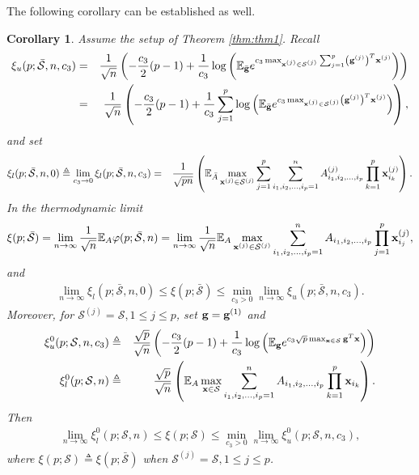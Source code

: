 \documentclass[10pt]{article}
\def\x{{\bf x}}
\def\x{{\mathbf x}}
\def\x{{\bf x}}
\def\x{{\bf x}}
\def\g{{\bf g}}
\def\mE{{\mathbb E}}
\def\lp{\left (}
\def\rp{\right )}
\def\x{{\bf x}}
\def\x{{\mathbf x}}
\def\x{{\bf x}}
\def\x{{\bf x}}
\def\g{{\bf g}}
\def\cS{{\mathcal S}}
\def\bcS{\bar{\mathcal S}}
\newtheorem{corollary}{Corollary}
\begin{document}
The following corollary can be established as well.
\begin{corollary}
\label{cor:cor1}
 Assume the setup of Theorem \ref{thm:thm1}. Recall
\begin{eqnarray}
   \label{eq:cor1eq1}
\xi_u(p;\bcS,n,c_3) & = & \frac{1}{\sqrt{n}} \lp -\frac{c_{3}}{2}(p-1)  + \frac{1}{c_{3}} \log\lp  \mE_{\bar{\g}} e^{c_{3}\max_{\x^{(j)}\in\cS^{(j)}} \sum_{j=1}^p \lp\g^{(j)}\rp^T\x^{(j)} } \rp \rp
\nonumber \\
& = & \frac{1}{\sqrt{n}} \lp -\frac{c_{3}}{2}(p-1)  + \frac{1}{c_{3}} \sum_{j=1}^p  \log\lp  \mE_{\bar{\g}} e^{c_{3}\max_{\x^{(j)}\in\cS^{(j)}} \lp\g^{(j)}\rp^T\x^{(j)} } \rp \rp,
\end{eqnarray}
and set
\begin{eqnarray}
   \label{eq:cor1eq2}
 \xi_l(p;\bcS,n,0) \triangleq \lim_{c_{3}\rightarrow 0}\xi_l(p;\bcS,n,c_{3}) & = &  \frac{1}{\sqrt{p n}}\lp \mE_{\bar{A}} \max_{\x^{(j)}\in\cS^{(j)}} \sum_{j=1}^p \sum_{i_1,i_2,\dots,i_p=1}^n A^{(j)}_{i_1,i_2,\dots,i_p}\prod_{k=1}^{p}\x_{i_k}^{(j)}
 \rp.
\end{eqnarray}
 In the thermodynamic limit
\begin{eqnarray}
   \label{eq:cor1eq3}
\xi(p;\bcS) = \lim_{n\rightarrow\infty} \frac{1}{\sqrt{n}}\mE_A \varphi(p;\bcS,n)
= \lim_{n\rightarrow\infty} \frac{1}{\sqrt{n}}\mE_A \max_{\x^{(j)}\in\cS^{(j)}} \sum_{i_1,i_2,\dots,i_p=1}^n A_{i_1,i_2,\dots,i_p}\prod_{j=1}^{p}\x_{i_j}^{(j)},
\end{eqnarray}
and
\begin{eqnarray}
   \label{eq:cor1eq4}
\lim_{n\rightarrow \infty} \xi_l(p;\bcS,n,0)  \leq \xi(p;\bcS)  \leq \min_{c_{3}>0} \lim_{n\rightarrow \infty}  \xi_u(p;\bcS,n,c_{3}).
\end{eqnarray}
Moreover, for $\cS^{(j)}=\cS,1\leq j\leq p$, set $\g=\g^{(1)}$ and
\begin{eqnarray}
   \label{eq:cor1eq5}
  \xi_u^0(p;\cS,n,c_3) & \triangleq &  \frac{ \sqrt{p}}{\sqrt{n}} \lp -\frac{c_{3}}{2}(p-1)  + \frac{1}{c_{3}} \log\lp  \mE_{\g} e^{ c_{3} \sqrt{p} \max_{\x\in\cS } \g^T\x } \rp \rp  \nonumber \\
  \xi_l^0(p;\cS,n) & \triangleq & \frac{ \sqrt{p}}{\sqrt{ n}}\lp \mE_{A} \max_{\x\in\cS} \sum_{i_1,i_2,\dots,i_p=1}^n A_{i_1,i_2,\dots,i_p}\prod_{k=1}^{p}\x_{i_k}
 \rp.
\end{eqnarray}
Then
\begin{eqnarray}
   \label{eq:cor1eq6}
\lim_{n\rightarrow \infty} \xi_l^0(p;\cS,n)  \leq \xi(p;\cS)
 \leq \min_{c_{3}>0} \lim_{n\rightarrow \infty}  \xi_u^0(p;\cS,n,c_{3}),
\end{eqnarray}
where $ \xi(p;\cS)\triangleq\xi(p;\bcS)$ when $\cS^{(j)}=\cS,1\leq j\leq p$.
 \end{corollary}
\end{document}
